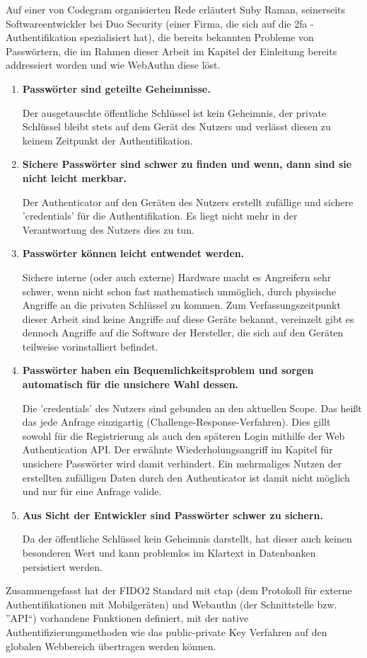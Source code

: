 Auf einer von Codegram organisierten Rede erläutert Suby Raman, seinerseits Softwareentwickler bei Duo Security (einer Firma, die sich auf die \ac{2fa} - Authentifikation spezialisiert hat), die bereits bekannten Probleme von Passwörtern, die im Rahmen dieser Arbeit im Kapitel der Einleitung bereits addressiert worden und wie WebAuthn diese löst.

\begin{enumerate} 
\item \textbf{Passwörter sind geteilte Geheimnisse.}

Der ausgetauschte öffentliche Schlüssel ist kein Geheimnis, der private Schlüssel bleibt stets auf dem Gerät des Nutzers und verlässt diesen zu keinem Zeitpunkt der Authentifikation.
\newpage

\item \textbf{Sichere Passwörter sind schwer zu finden und wenn, dann sind sie nicht leicht merkbar.}

Der Authenticator auf den Geräten des Nutzers erstellt zufällige und sichere 'credentials' für die Authentifikation. Es liegt nicht mehr in der Verantwortung des Nutzers dies zu tun.

\item \textbf{Passwörter können leicht entwendet werden.}

Sichere interne (oder auch externe) Hardware macht es Angreifern sehr schwer, wenn nicht schon fast mathematisch unmöglich, durch physische Angriffe an die privaten Schlüssel zu kommen. Zum Verfassungszeitpunkt dieser Arbeit sind keine Angriffe auf diese Geräte bekannt, vereinzelt gibt es dennoch Angriffe auf die Software der Hersteller, die sich auf den Geräten teilweise vorinstalliert befindet.

\item \textbf{Passwörter haben ein Bequemlichkeitsproblem und sorgen automatisch für die unsichere Wahl dessen.}

Die 'credentials' des Nutzers sind gebunden an den aktuellen Scope. Das heißt das jede Anfrage einzigartig (Challenge-Response-Verfahren). Dies gillt sowohl für die Registrierung als auch den späteren Login mithilfe der Web Authentication API. Der erwähnte Wiederholungsangriff im Kapitel für unsichere Passwörter wird damit verhindert. Ein mehrmaliges Nutzen der erstellten zufälligen Daten durch den Authenticator ist damit nicht möglich und nur für eine Anfrage valide.

\item \textbf{Aus Sicht der Entwickler sind Passwörter schwer zu sichern.}

Da der öffentliche Schlüssel kein Geheimnis darstellt, hat dieser auch keinen besonderen Wert und kann problemlos im Klartext in Datenbanken persistiert werden.
\end{enumerate}

Zusammengefasst hat der FIDO2 Standard mit \ac{ctap} (dem Protokoll für externe Authentifikationen mit Mobilgeräten) und Webauthn (der Schnittstelle bzw. ''API``) vorhandene Funktionen definiert, mit der native Authentifizierungsmethoden wie das public-private Key Verfahren auf den globalen Webbereich übertragen werden können.
